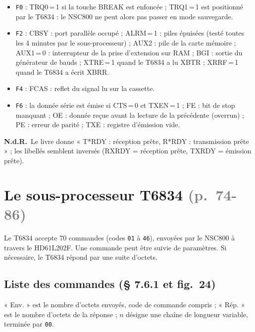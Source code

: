 \documentclass[a4paper,10pt]{article}
\newcommand{\hex}[1]{\texttt{#1}}
\newcommand{\pg}[1]{\texorpdfstring{\textcolor{gray}{\small(p.~#1)}}{}}
\newcommand{\nota}[1]{\textcolor{red!60!black}{\small\textbf{N.d.R.}~#1}}
\begin{document}
\begin{itemize}
  \item \hex{F0} : TRQ0\,=\,1 si la touche BREAK est enfoncée ; TRQ1\,=\,1 est
        positionné par le T6834 : le NSC800 ne peut alors pas passer en mode
        sauvegarde.
  \item \hex{F2} : CBSY : port parallèle occupé ; ALRM\,=\,1 : piles
        épuisées (testé toutes les 4 minutes par le sous-processeur) ;
        AUX2 : pile de la carte mémoire ; AUX1\,=\,0 : interrupteur de la prise
        d'extension sur RAM ; BGI : sortie du générateur de bauds ;
        XTRE\,=\,1 quand le T6834 a lu XBTR ; XRRF\,=\,1 quand le T6834 a
        écrit XBRR.
  \item \hex{F4} : FCAS : reflet du signal lu sur la cassette.
  \item \hex{F6} : la donnée série est émise si CTS\,=\,0 et TXEN\,=\,1 ;
        FE : bit de stop manquant ; OE : donnée reçue avant la lecture de la
        précédente (overrun) ; PE : erreur de parité ; TXE : registre
        d'émission vide.
\end{itemize}
\nota{Le livre donne « T*RDY : réception prête, R*RDY : transmission prête » ;
les libellés semblent inversés (RXRDY = réception prête, TXRDY = émission prête).}

\section{Le sous-processeur T6834 \pg{74-86}}

Le T6834 accepte 70 commandes (codes \hex{01} à \hex{46}), envoyées par le
NSC800 à travers le HD61L202F. Une commande peut être suivie de paramètres.
Si nécessaire, le T6834 répond par une suite d'octets.

\subsection{Liste des commandes (§ 7.6.1 et fig.~24)}
« Env. » est le nombre d'octets envoyés, code de commande compris ; « Rép. »
est le nombre d'octets de la réponse ; $n$ désigne une chaîne de longueur
variable, terminée par \hex{00}.
\end{document}

